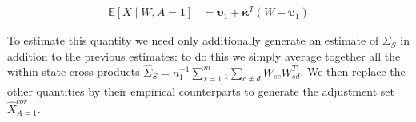 \begin{align*}
    \mathbb{E}[X \mid W, A = 1] &=  \boldsymbol{\upsilon}_1 + \boldsymbol{\kappa}^T(W - \boldsymbol{\upsilon}_1)
\end{align*}

To estimate this quantity we need only additionally generate an estimate of $\Sigma_{S}$ in addition to the previous estimates: to do this we simply average together all the within-state cross-products $\hat{\Sigma}_{S} = n_1^{-1}\sum_{s=1}^m_1\sum_{c\ne d}W_{sc}W_{sd}^T$. We then replace the other quantities by their empirical counterparts to generate the adjustment set $\hat{X}_{A=1}^{cor}$.